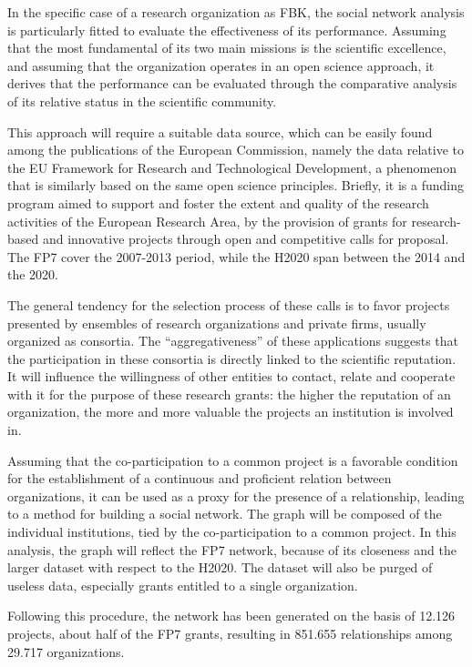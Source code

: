 In the specific case of a research organization as FBK, the social network analysis is particularly fitted to evaluate the effectiveness of its performance. Assuming that the most fundamental of its two main missions is the scientific excellence, and assuming that the organization operates in an open science approach, it derives that the performance can be evaluated through the comparative analysis of its relative status in the scientific community.

This approach will require a suitable data source, which can be easily found among the publications of the European Commission, namely the data relative to the EU Framework for Research and Technological Development, a phenomenon that is similarly based on the same open science principles. Briefly, it is a funding program aimed to support and foster the extent and quality of the research activities of the European Research Area, by the provision of grants for research-based and innovative projects through open and competitive calls for proposal. The FP7 cover the 2007-2013 period, while the H2020 span between the 2014 and the 2020.

The general tendency for the selection process of these calls is to favor projects presented by ensembles of research organizations and private firms, usually organized as consortia. The \enquote{aggregativeness} of these applications suggests that the participation in these consortia is directly linked to the scientific reputation. It will influence the willingness of other entities to contact, relate and cooperate with it for the purpose of these research grants: the higher the reputation of an organization, the more and more valuable the projects an institution is involved in.

Assuming that the co-participation to a common project is a favorable condition for the establishment of a continuous and proficient relation between organizations, it can be used as a proxy for the presence of a relationship, leading to a method for building a social network. The graph will be composed of the individual institutions, tied by the co-participation to a common project. In this analysis, the graph will reflect the FP7 network, because of its closeness and the larger dataset with respect to the H2020. The dataset will also be purged of useless data, especially grants entitled to a single organization. 

Following this procedure, the network has been generated on the basis of 12.126 projects, about half of the FP7 grants, resulting in 851.655 relationships among 29.717 organizations. 

